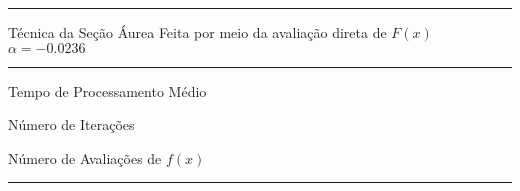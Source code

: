         \begin{minipage}[h!]{\linewidth}            
            \centering
            \hrule
            \vspace{2mm}
            Técnica da Seção Áurea Feita por meio da avaliação direta de $F(x)$ \\ $\alpha=-0.0236$
            \vspace{2mm}
            \noindent
            \hrule 
            \vspace{2mm}
            Tempo de Processamento Médio\\
            \label{tab:tblAa} 
            \writetablestt{\tblAa}\par
            \bigskip
            \centering
            Número de Iterações\\
            \label{tab:tblAb} 
            \writetablestt{\tblAb}\par
            \bigskip
            \centering
            Número de Avaliações de $f(x)$\\
            \label{tab:tblAc} 
            \writetablestt{\tblAc}\par
            \vspace{2mm}
            \hrule
            \vspace{2mm}
        \end{minipage}

             

 
            

